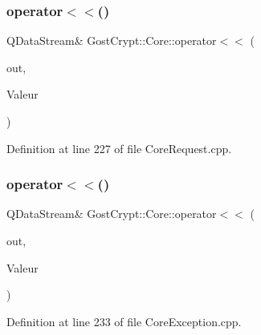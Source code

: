 \subsubsection{\texorpdfstring{operator$<$$<$()}{operator<<()}\hspace{0.1cm}{\footnotesize\ttfamily [44/56]}}
{\footnotesize\ttfamily Q\+Data\+Stream\& Gost\+Crypt\+::\+Core\+::operator$<$$<$ (\begin{DoxyParamCaption}\item[{Q\+Data\+Stream \&}]{out,  }\item[{const \hyperlink{struct_gost_crypt_1_1_core_1_1_get_encryption_algorithms_request}{Get\+Encryption\+Algorithms\+Request} \&}]{Valeur }\end{DoxyParamCaption})}



Definition at line 227 of file Core\+Request.\+cpp.

\mbox{\label{namespace_gost_crypt_1_1_core_a87a209dcc070f276649e361fec6b80a3}} 
\subsubsection{\texorpdfstring{operator$<$$<$()}{operator<<()}\hspace{0.1cm}{\footnotesize\ttfamily [45/56]}}
{\footnotesize\ttfamily Q\+Data\+Stream\& Gost\+Crypt\+::\+Core\+::operator$<$$<$ (\begin{DoxyParamCaption}\item[{Q\+Data\+Stream \&}]{out,  }\item[{const \hyperlink{class_gost_crypt_1_1_core_1_1_algorithm_not_found}{Gost\+Crypt\+::\+Core\+::\+Algorithm\+Not\+Found} \&}]{Valeur }\end{DoxyParamCaption})}



Definition at line 233 of file Core\+Exception.\+cpp.

\mbox{\label{namespace_gost_crypt_1_1_core_a6f83057428e1e2c35135d9aa77d94e85}} 
